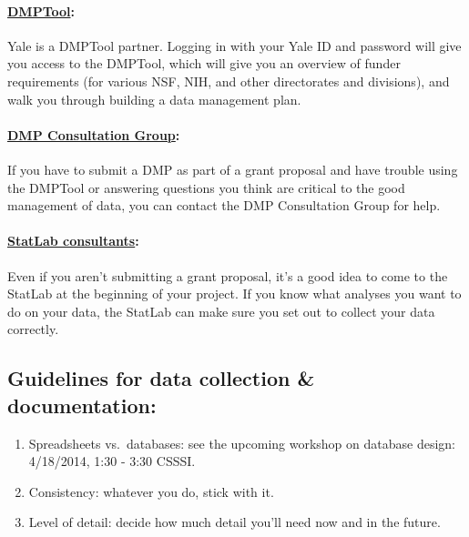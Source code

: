 \documentclass{tufte-handout}
\begin{document}
\paragraph{\href{https://dmp.cdlib.org/}{DMPTool}:}\label{dmptool}

Yale is a DMPTool partner. Logging in with your Yale ID and password
will give you access to the DMPTool, which will give you an overview of
funder requirements (for various NSF, NIH, and other directorates and
divisions), and walk you through building a data management plan.

\paragraph{\href{http://csssi.yale.edu/dmp}{DMP Consultation
Group}:}\label{dmp-consultation-group}

If you have to submit a DMP as part of a grant proposal and have trouble
using the DMPTool or answering questions you think are critical to the
good management of data, you can contact the DMP Consultation Group for
help.

\paragraph{\href{http://csssi.yale.edu/csssi-statistical-consultants-schedule}{StatLab
consultants}:}\label{statlab-consultants}

Even if you aren't submitting a grant proposal, it's a good idea to come
to the StatLab at the beginning of your project. If you know what
analyses you want to do on your data, the StatLab can make sure you set
out to collect your data correctly.

\marginnote
{\subsection{Guidelines for data collection \& documentation:}\label{guidelines-doc}
\begin{enumerate}
\def\labelenumi{\arabic{enumi}.}
\itemsep1pt\parskip0pt
\item
  Spreadsheets vs.~databases: see the upcoming workshop on database
  design: 4/18/2014, 1:30 - 3:30 CSSSI.
\item
  Consistency: whatever you do, stick with it.
\item
  Level of detail: decide how much detail you'll need now and in the
  future.
\end{enumerate}}
\end{document}
